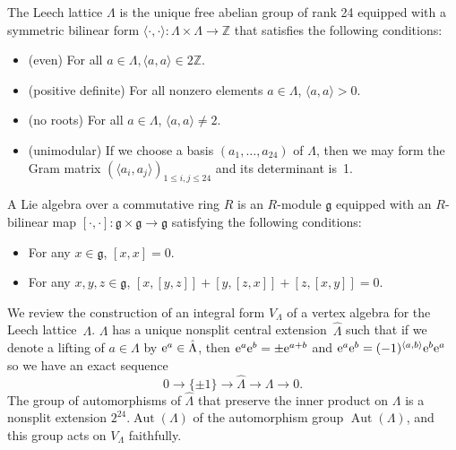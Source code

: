 \documentclass[pdftex]{sigma}%
\numberwithin{equation}{section}
\begin{document}
\begin{Definition}
The Leech lattice $\Lambda$ is the unique free abelian group of rank 24 equipped with a symmetric bilinear form $\langle \cdot ,\cdot \rangle\colon \Lambda \times \Lambda \rightarrow \mathbb{Z}$ that satisfies the following conditions:
 \begin{itemize}\itemsep=0pt
 \item (even) For all $a \in \Lambda, \langle a,a \rangle \in 2\mathbb{Z}$.
 \item (positive definite) For all nonzero elements $a \in \Lambda$, $\langle a,a \rangle > 0$.
 \item (no roots) For all $a \in \Lambda$, $\langle a,a \rangle \neq 2$.
 \item (unimodular) If we choose a basis $(a_1,\dots,a_{24})$ of $\Lambda$, then we may form the Gram matrix $(\langle a_i,a_j \rangle)_{1\leq i,j\leq 24}$ and its determinant is~1.
 \end{itemize}
\end{Definition}

\begin{Definition}
A Lie algebra over a commutative ring $R$ is an $R$-module $\mathfrak{g}$ equipped with an $R$-bilinear map $[\cdot,\cdot]\colon \mathfrak{g}\times\mathfrak{g}\rightarrow \mathfrak{g}$ satisfying the following conditions:
 \begin{itemize}\itemsep=0pt
 \item For any $x \in \mathfrak{g}$, $[x,x]=0$.
 \item For any $x,y,z \in \mathfrak{g}$, $[x,[y,z]]+[y,[z,x]]+[z,[x,y]]=0$.
 \end{itemize}
\end{Definition}

 We review the construction of an integral form $V_\Lambda$ of a vertex algebra for the Leech lattice~$\Lambda$.
$\Lambda$ has a unique nonsplit central extension~$\hat{\Lambda}$ such that if we denote a lifting of $a \in \Lambda$ by ${\rm e}^a\in \hat{\Lambda}$, then ${\rm e}^a{\rm e}^b=\pm {\rm e}^{a+b}$ and ${\rm e}^a{\rm e}^b=(-1)^{\langle a,b\rangle}{\rm e}^b{\rm e}^a$ so we have an exact sequence
\[
0\rightarrow \{\pm1\}\rightarrow \hat{\Lambda}\rightarrow \Lambda \rightarrow 0.
\]
The group of automorphisms of $\hat{\Lambda}$ that preserve the inner product on $\Lambda$ is a nonsplit extension $2^{24}.\operatorname{Aut}(\Lambda)$ of the automorphism group $\operatorname{Aut}(\Lambda)$, and this group acts on $V_{\Lambda}$ faithfully.
\end{document}
